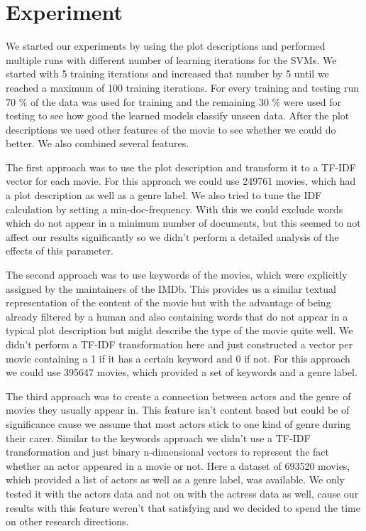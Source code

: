 \documentclass{vldb}
\begin{document}
\section{Experiment}


\par We started our experiments by using the plot descriptions and performed multiple runs with different number of learning iterations for the SVMs. We started with 5 training iterations and increased that number by 5 until we reached a maximum of 100 training iterations. For every training and testing run 70 \% of the data was used for training and the remaining 30 \% were used for testing to see how good the learned models classify unseen data. After the plot descriptions we used other features of the movie to see whether we could do better. We also combined several features.

\par The first approach was to use the plot description and transform it to a TF-IDF vector for each movie. For this approach we could use 249761 movies, which had a plot description as well as a genre label. We also tried to tune the IDF calculation by setting a min-doc-frequency. With this we could exclude words which do not appear in a minimum number of documents, but this seemed to not affect our results significantly so we didn't perform a detailed analysis of the effects of this parameter.

\par The second approach was to use keywords of the movies, which were explicitly assigned by the maintainers of the IMDb. This provides us a similar textual representation of the content of the movie but with the advantage of being already filtered by a human and also containing words that do not appear in a typical plot description but might describe the type of  the movie quite well. We didn't perform a TF-IDF transformation here and just constructed a vector per movie containing a 1 if it has a certain keyword and 0 if not. For this approach we could use 395647 movies, which provided a set of keywords and a genre label.

\par The third approach was to create a connection between actors and the genre of movies they usually appear in. This feature isn't content based but could be of significance cause we assume that most actors stick to one kind of genre during their carer. Similar to the keywords approach we didn't use a TF-IDF transformation and just binary n-dimensional vectors to represent the fact whether an actor appeared in a movie or not. Here a dataset of 693520 movies, which provided a list of actors as well as a genre label, was available. We only tested it with the actors data and not on with the actress data as well, cause our results with this feature weren't that satisfying and we decided to spend the time on other research directions.
\end{document}
